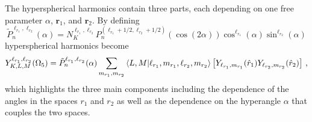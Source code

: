 The hyperspherical harmonics contain three parts, each depending on one free parameter $\alpha$, $\mathbf{r}_1$, and $\mathbf{r}_2$. By defining 
\begin{equation}
    \tilde{P}^{\ell_{r_1},\ell_{r_2}}_{n}(\alpha) = N^{\ell_{r_1},\ell_{r_2}}_K P_n^{(\ell_{r_1}+1/2,\ell_{r_2}+1/2)}(\cos(2\alpha)) \cos^{\ell_{r_1}}(\alpha) \sin^{\ell_{r_2}}(\alpha) 
\end{equation}
hyperspherical harmonics become
\begin{equation}
    Y^{\ell_{r_1},\ell_{r_2}}_{K,L,M}(\Omega_{5}) =\tilde{P}^{\ell_{r_1},\ell_{r_2}}_{n}(\alpha)\sum_{m_{r_1},m_{r_2}}\bra{L,M}\ket{\ell_{r_1},m_{r_1},\ell_{r_2},m_{r_2}}  \left[Y_{\ell_{r_1},m_{r_1}}(\hat{r}_1) Y_{\ell_{r_2},m_{r_2}}(\hat{r}_2)\right]\, ,
    \label{eq:hyperspherical_harm_simple}
\end{equation}
which highlights the three main components including the dependence of the angles in the spaces $r_1$ and $r_2$ as well as the dependence on the hyperangle $\alpha$ that couples the two spaces.
 
